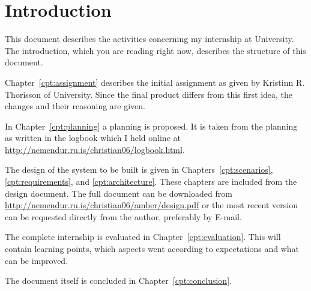\chapter{\label{cpt:introduction}Introduction}

This document describes the activities concerning my internship at \Rvk{}
University. The introduction, which you are reading right now, describes the
structure of this document.

Chapter~\ref{cpt:assignment} describes the initial assignment as given by
Kristinn R.  Thorisson of \Rvk{} University. Since the final product differs
from this first idea, the changes and their reasoning are given.

In Chapter~\ref{cpt:planning} a planning is proposed. It is taken from the
planning as written in the logbook which I held online at
\url{http://nemendur.ru.is/christian06/logbook.html}.

The design of the system to be built is given in Chapters~\ref{cpt:scenarios},
\ref{cpt:requirements}, and \ref{cpt:architecture}. These chapters are included
from the design document. The full document can be downloaded from
\url{http://nemendur.ru.is/christian06/amber/design.pdf} or the most recent
version can be requested directly from the author, preferably by E-mail.

The complete internship is evaluated in Chapter~\ref{cpt:evaluation}. This will
contain learning points, which aspects went according to expectations and what
can be improved.

The document itself is concluded in Chapter~\ref{cpt:conclusion}.

